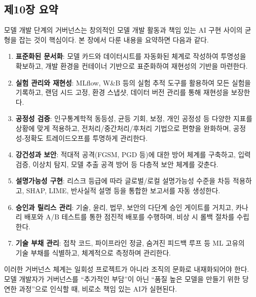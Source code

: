 \subsection*{제10장 요약}

모델 개발 단계의 거버넌스는 창의적인 모델 개발 활동과 책임 있는 AI 구현 사이의 균형을 잡는 것이 핵심이다. 본 장에서 다룬 내용을 요약하면 다음과 같다.

\begin{enumerate}
  \item \textbf{표준화된 문서화}: 모델 카드\cite{mitchell2019model}와 데이터시트\cite{gebru2021datasheets}를 자동화된 체계로 작성하여 투명성을 확보하고, 개발 환경을 컨테이너 기반으로 표준화하여 재현성의 기반을 마련한다.

  \item \textbf{실험 관리와 재현성}: MLflow, W\&B 등의 실험 추적 도구를 활용하여 모든 실험을 기록하고, 랜덤 시드 고정, 환경 스냅샷, 데이터 버전 관리를 통해 재현성을 보장한다.

  \item \textbf{공정성 검증}: 인구통계학적 동등성, 균등 기회, 보정, 개인 공정성 등 다양한 지표를 상황에 맞게 적용하고, 전처리/중간처리/후처리 기법으로 편향을 완화하며, 공정성-정확도 트레이드오프를 투명하게 관리한다.

  \item \textbf{강건성과 보안}: 적대적 공격(FGSM, PGD 등)\cite{goodfellow2014explaining}에 대한 방어 체계를 구축하고, 입력 검증, 이상치 탐지, 모델 추출 공격 방어 등 다층적 보안 체계를 갖춘다.

  \item \textbf{설명가능성 구현}: 리스크 등급에 따라 글로벌/로컬 설명가능성 수준을 차등 적용하고\cite{arrieta2020explainable}, SHAP, LIME, 반사실적 설명 등을 통합한 보고서를 자동 생성한다.

  \item \textbf{승인과 릴리스 관리}: 기술, 윤리, 법무, 보안의 다단계 승인 게이트를 거치고, 카나리 배포와 A/B 테스트를 통한 점진적 배포를 수행하며, 비상 시 롤백 절차를 수립한다.

  \item \textbf{기술 부채 관리}: 접착 코드, 파이프라인 정글, 숨겨진 피드백 루프 등 ML 고유의 기술 부채\cite{sculley2015hidden}를 식별하고, 체계적으로 측정하며 관리한다.
\end{enumerate}

이러한 거버넌스 체계는 일회성 프로젝트가 아니라 조직의 문화로 내재화되어야 한다. 모델 개발자가 거버넌스를 ``추가적인 부담''이 아닌 ``품질 높은 모델을 만들기 위한 당연한 과정''으로 인식할 때, 비로소 책임 있는 AI가 실현된다.

